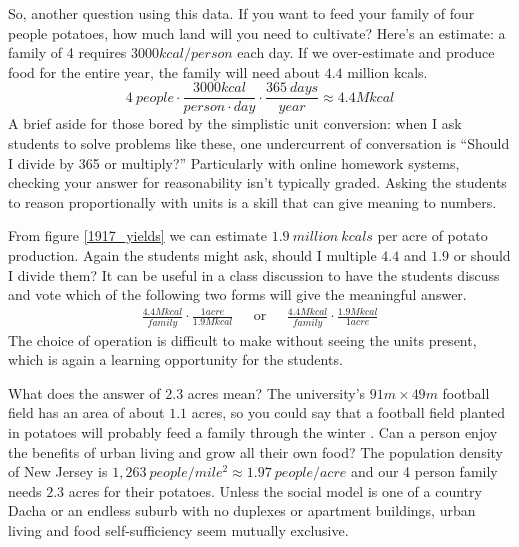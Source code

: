 \documentclass[12pt]{iopart}
\newcommand{\be}{\begin{equation}}
\newcommand{\ee}{\end{equation}}
\newcommand{\bea}{\begin{eqnarray}}
\newcommand{\eea}{\end{eqnarray}}
\begin{document}
So, another question using this data.  If you want to feed your family of four people potatoes, how much land will you need to cultivate?
Here's an estimate: a family of 4 requires $3000kcal/person$ each day\cite{calorie_age}.  If we over-estimate and produce food for the entire year, the family will need about $4.4$ million kcals.
\be
4~people\cdot\frac{3000kcal}{person\cdot day}\cdot\frac{365~days}{year} \approx 4.4 M kcal 
\ee
A brief aside for those bored by the simplistic unit conversion: when I ask students to solve problems like these, one undercurrent of conversation is ``Should I divide by 365 or multiply?''  Particularly with online homework systems, checking your answer for reasonability isn't  typically graded. Asking the students to reason proportionally with units is a skill that can give meaning to numbers. 

From figure \ref{1917_yields} we can estimate $1.9~million~kcals$ per acre of potato production.  Again the students might ask, should I multiple $4.4$ and $1.9$ or should I divide them?  It can be useful in a class discussion to have the students discuss and vote which of the following two forms will give the meaningful answer.
\bea
\frac{4.4 M kcal}{family}\cdot\frac{1 acre}{1.9M kcal}  & \textrm{~~or~~}&
\frac{4.4 M kcal}{family}\cdot\frac{1.9M kcal}{1 acre}
\eea
The choice of operation is difficult to make without seeing the units present, which is again a learning opportunity for the students.

What does the answer of $2.3$ acres mean?  The university's $91m\times49m$ football field has an area of about $1.1$ acres, so you could say that a football field planted in potatoes will probably feed a family through the winter \cite{Deppe}.  Can a person enjoy the benefits of urban living and grow all their own food?  The population density of New Jersey is $1,263~people/mile^2 \approx1.97~people/acre$ and our 4 person family needs $2.3$ acres for their potatoes.  
Unless the social model is one of a country Dacha or an endless suburb with no duplexes or apartment buildings, urban living and food self-sufficiency seem mutually exclusive.
\end{document}
